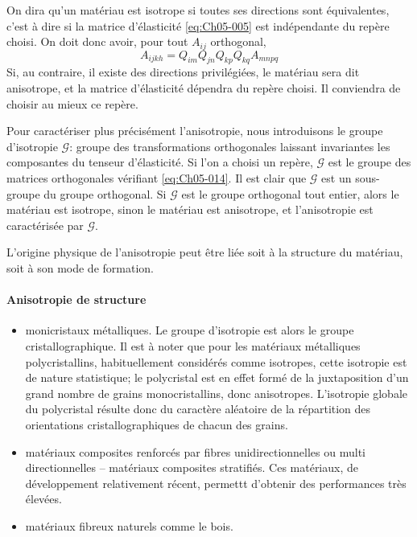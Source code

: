 On dira qu'un matériau est isotrope si toutes ses directions sont équivalentes, c'est à dire si la matrice d'élasticité \eqref{eq:Ch05-005} est indépendante du repère choisi.
On doit donc avoir, pour tout $A_{ij}$ orthogonal,
\begin{equation}
    A_{ijkh} = Q_{im} Q_{jn} Q_{kp} Q_{kq} A_{mnpq}
    \label{eq:Ch05-014}
\end{equation}
Si, au contraire, il existe des directions privilégiées, le matériau sera dit anisotrope, et la matrice d'élasticité dépendra du repère choisi.
Il conviendra de choisir au mieux ce repère.

Pour caractériser plus précisément l'anisotropie, nous introduisons le groupe d'isotropie $\mathcal{G}$: groupe des transformations orthogonales laissant invariantes les composantes du tenseur d'élasticité.
Si l'on a choisi un repère, $\mathcal{G}$ est le groupe des matrices orthogonales vérifiant \eqref{eq:Ch05-014}.
Il est clair que $\mathcal{G}$ est un sous-groupe du groupe orthogonal.
Si $\mathcal{G}$ est le groupe orthogonal tout entier, alors le matériau est isotrope, sinon le matériau est anisotrope, et l'anisotropie est caractérisée par $\mathcal{G}$.

L'origine physique de l'anisotropie peut être liée soit à la structure du matériau, soit à son mode de formation. 

\paragraph{Anisotropie de structure}
\begin{itemize}
    \item monicristaux métalliques.
        Le groupe d'isotropie est alors le groupe cristallographique.
        Il est à noter que pour les matériaux métalliques polycristallins, habituellement considérés comme isotropes, cette isotropie est de nature statistique; le polycristal est en effet formé de la juxtaposition d'un grand nombre de grains monocristallins, donc anisotropes.
        L'isotropie globale du polycristal résulte donc du caractère aléatoire de la répartition des orientations cristallographiques de chacun des grains.
    \item matériaux composites renforcés par fibres unidirectionnelles ou multi directionnelles -- matériaux composites stratifiés.
        Ces matériaux, de développement relativement récent, permettt d'obtenir des performances très élevées.
    \item matériaux fibreux naturels comme le bois.
\end{itemize}

